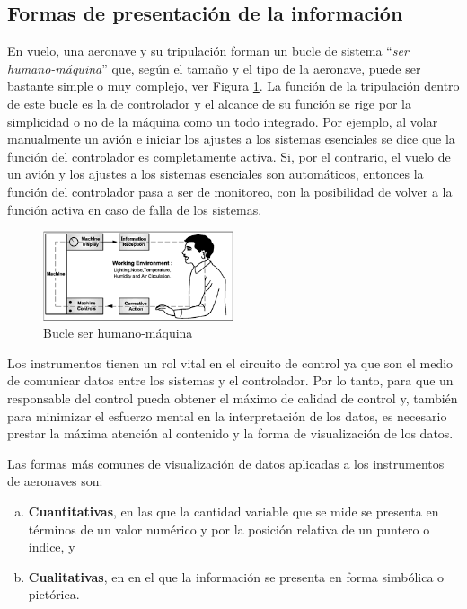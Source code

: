 \subsection{Formas de presentaci\'on de la informaci\'on}
\label{sec:formas.presentacion.informacion}

En vuelo, una aeronave y su tripulación forman un bucle de sistema ``{\it ser humano-máquina}'' que, según el tamaño y el tipo de la aeronave, puede ser bastante simple o muy complejo, ver Figura \ref{fig:01.bucle.ser.humano.maquina}. 
La función de la tripulaci\'on dentro de este bucle es la de controlador y el alcance de su función se rige por la simplicidad o no de la máquina como un todo integrado. 
Por ejemplo, al volar manualmente un avión e iniciar los ajustes a los sistemas esenciales se dice que la función del controlador es completamente activa. Si, por el contrario, el vuelo de un avión y los ajustes a los sistemas esenciales son automáticos, entonces la función del controlador pasa a ser de monitoreo, con la posibilidad de volver a la función activa en caso de falla de los sistemas.


\begin{figure}[!htb]
  \centering
  \includegraphics[width=0.5\textwidth]{01.tablero.instrumentos/U01.imagenes/1.1.introduccion/01-bucle_hbre_maquina.png}
  
  \caption{Bucle ser humano-m\'aquina \protect\cite{cabina_ergonomia_fisica}}
\label{fig:01.bucle.ser.humano.maquina}
\end{figure}



Los instrumentos tienen un rol vital en el circuito de control ya que son el medio de comunicar datos entre los sistemas y el controlador. Por lo tanto, para que un responsable del control  pueda obtener el máximo de calidad de control y, también para minimizar el esfuerzo mental en la interpretación de los datos, es necesario prestar la máxima atención al contenido y la forma de visualización de los datos.

Las formas más comunes de visualización de datos aplicadas a los instrumentos de aeronaves son:

\begin{enumerate}[a)]
\item \textbf{Cuantitativas}, en las que la cantidad variable que se mide
  se presenta en términos de un valor numérico y por la posición
  relativa de un puntero o índice, y
\item \textbf{Cualitativas}, en en el que la
  información se presenta en forma simbólica o pictórica.
\end{enumerate}

